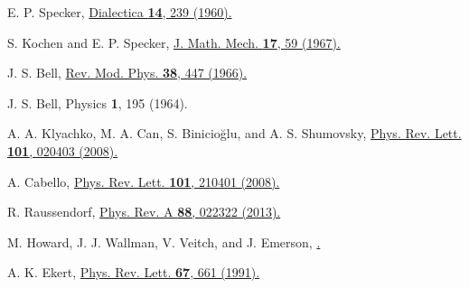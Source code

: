 \documentclass[pra,letterpaper,english,preprint,nofootinbib,aps,superscriptaddress,showkeys]{revtex4-1}
\theoremstyle{definition}
\theoremstyle{remark}
\begin{document}
\begin{thebibliography}{10}
 E. P. Specker,
 \href{http://onlinelibrary.wiley.com/doi/10.1111/j.1746-8361.1960.tb00422.x/abstract}{Dialectica \textbf{14}, 239 (1960).}

 S. Kochen and E. P. Specker,
 \href{http://www.iumj.indiana.edu/IUMJ/fulltext.php?year=1968&volume=17&artid=17004}{J. Math. Mech. \textbf{17}, 59 (1967).}

 J. S. Bell,
 \href{http://rmp.aps.org/abstract/RMP/v38/i3/p447_1}{Rev. Mod. Phys. \textbf{38}, 447 (1966).}

 J. S. Bell,
 Physics \textbf{1}, 195 (1964).


 A. A. Klyachko, M. A. Can, S. Binicio\u{g}lu, and A. S. Shumovsky,
 \href{http://dx.doi.org/10.1103/PhysRevLett.101.020403}{Phys. Rev. Lett. \textbf{101}, 020403 (2008).}

 A. Cabello,
 \href{http://dx.doi.org/10.1103/PhysRevLett.101.210401 }{Phys. Rev. Lett. \textbf{101}, 210401 (2008).}




 R. Raussendorf,
 \href{http://link.aps.org/doi/10.1103/PhysRevA.88.022322}{Phys. Rev. A \textbf{88}, 022322 (2013).}

 M. Howard, J. J. Wallman, V. Veitch, and J. Emerson,
 \href{http://arxiv.org/abs/1401.4174}{.}


 A. K. Ekert,
 \href{http://journals.aps.org/prl/abstract/10.1103/PhysRevLett.67.661}{Phys. Rev. Lett. \textbf{67}, 661 (1991).}


\end{thebibliography}
\end{document}
